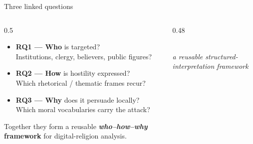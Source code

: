 \documentclass[aspectratio=169,10pt]{beamer}
\newcommand{\emphc}[1]{\textcolor{uzhaccent}{\textbf{#1}}}
\begin{document}
\begin{frame}{Three linked questions}
  \begin{columns}[T,onlytextwidth]
    \begin{column}{0.5\textwidth}
    \small
    \begin{itemize}
      \item \textbf{RQ1 — \emphc{Who}} is targeted? \\
        {\footnotesize Institutions, clergy, believers, public figures?}
      \item \textbf{RQ2 — \emphc{How}} is hostility expressed? \\
        {\footnotesize Which rhetorical / thematic frames recur?}
      \item \textbf{RQ3 — \emphc{Why}} does it persuade locally? \\
        {\footnotesize Which moral vocabularies carry the attack?}
    \end{itemize}
    \vspace{0.6em}

    Together they form a reusable
    \textcolor{uzhblue}{\textbf{\textit{who--how--why} framework}}
    for digital-religion analysis.
    \end{column}
    \begin{column}{0.48\textwidth}
    \centering
    \vspace{0.3em}
    \\[0.4em]
    \footnotesize\itshape
    \textcolor{uzhblue}{a reusable structured-interpretation framework}
    \end{column}
  \end{columns}
\end{frame}
\end{document}
